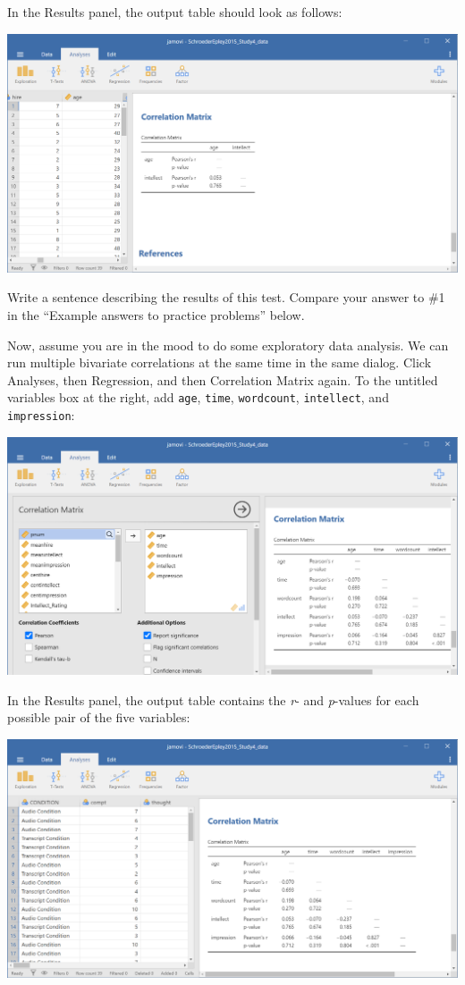 \documentclass[
]{book}
\begin{document}
In the Results panel, the output table should look as follows:

\includegraphics{img/7.4.63.png}

Write a sentence describing the results of this test. Compare your answer to \#1 in the ``Example answers to practice problems'' below.

Now, assume you are in the mood to do some exploratory data analysis. We can run multiple bivariate correlations at the same time in the same dialog. Click {Analyses}, then {Regression}, and then {Correlation Matrix} again. To the untitled variables box at the right, add \texttt{age}, \texttt{time}, \texttt{wordcount}, \texttt{intellect}, and \texttt{impression}:

\includegraphics{img/7.4.64.png}

In the Results panel, the output table contains the \emph{r}- and \emph{p}-values for each possible pair of the five variables:

\includegraphics{img/7.4.65.png}
\end{document}
